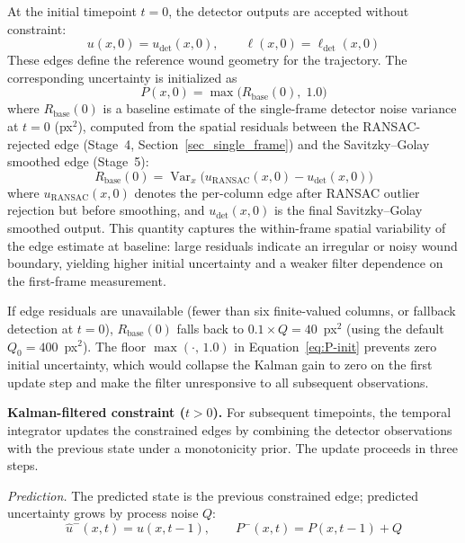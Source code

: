 At the initial timepoint $t = 0$, the detector outputs are accepted without constraint:
\begin{equation}
	u(x,0) = u_\text{det}(x,0), \qquad \ell(x,0) = \ell_\text{det}(x,0)
\end{equation}
These edges define the reference wound geometry for the trajectory. The corresponding uncertainty is initialized as
\begin{equation}
	P(x,0) = \max\!\bigl ( R_\text{base}(0),\; 1.0\bigr)
	\label{eq:P-init}
\end{equation}
where $R_\text{base}(0)$ is a baseline estimate of the single-frame detector noise variance at $t = 0$ (px$^2$), computed from the spatial residuals between the RANSAC-rejected edge (Stage~4, Section~\ref{sec_single_frame}) and the Savitzky--Golay smoothed edge (Stage~5):
\begin{equation}
	R_\text{base}(0) = \operatorname{Var}_x\!\bigl(u_\text{RANSAC}(x,0) - u_\text{det}(x,0)\bigr)
	\label{eq:Rbase-init}
\end{equation}
where $u_\text{RANSAC}(x,0)$ denotes the per-column edge after RANSAC outlier rejection but before smoothing, and $u_\text{det}(x,0)$ is the final Savitzky--Golay smoothed output. This quantity captures the within-frame spatial variability of the edge estimate at baseline: large residuals indicate an irregular or noisy wound boundary, yielding higher initial uncertainty and a weaker filter dependence on the first-frame measurement.

If edge residuals are unavailable (fewer than six finite-valued columns, or fallback detection at $t = 0$), $R_\text{base}(0)$ falls back to $0.1 \times Q = 40$~px$^2$ (using the default $Q_0 = 400$~px$^2$). The floor $\max(\cdot,\, 1.0)$ in Equation~\eqref{eq:P-init} prevents zero initial uncertainty, which would collapse the Kalman gain to zero on the first update step and make the filter unresponsive to all subsequent observations.

\textbf{Kalman-filtered constraint ($t > 0$).}
For subsequent timepoints, the temporal integrator updates the constrained edges by combining the detector observations with the previous state under a monotonicity prior. The update proceeds in three steps.

\emph{Prediction.}
The predicted state is the previous constrained edge; predicted uncertainty grows by process
noise $Q$:
\begin{equation}
	\hat{u}^-(x, t) = u(x, t-1), \qquad P^-(x, t) = P(x, t-1) + Q
	\label{eq:kalman-predict}
\end{equation}

